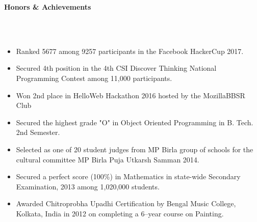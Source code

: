 \documentclass[a4paper,10pt]{article}
\newcommand{\lsep}{-0.5cm}
\newcommand{\resheading}[1]{{\large \colorbox{mygrey}{\begin{minipage}{0.99\textwidth}{\textbf{#1 \vphantom{p\^{E}}}}\end{minipage}}}}
\begin{document}
\resheading{\textbf{Honors \& Achievements}}\\[\lsep]\\[-0.2cm]
\begin{itemize}
\item {Ranked 5677 among 9257 participants in the Facebook HackerCup 2017.}
\item {Secured 4th position in the 4th CSI Discover Thinking National Programming Contest among 11,000 participants.}
\item {Won 2nd place in HelloWeb Hackathon 2016 hosted by the MozillaBBSR Club}
\item {Secured the highest grade "O" in Object Oriented Programming in B. Tech. 2nd Semester.}
\item{Selected as one of 20 student judges from MP Birla group of schools for the cultural committee MP Birla Puja Utkarsh Samman 2014.}
\item {Secured a perfect score (100\%) in Mathematics in state-wide Secondary Examination, 2013 among 1,020,000 students.}
\item {Awarded Chitroprobha Upadhi Certification by Bengal Music College, Kolkata, India in 2012 on completing a 6--year course on Painting.}\end{itemize}
\end{document}
